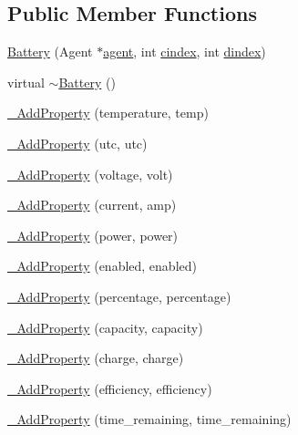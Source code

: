 \subsection*{Public Member Functions}
\begin{DoxyCompactItemize}
\item 
\hyperlink{classcubesat_1_1Battery_a2c27589782cfbb60129eb2a98a8ee0f4}{Battery} (Agent $\ast$\hyperlink{classcubesat_1_1Device_a8499108eccaf7375bea8ead0182391a6}{agent}, int \hyperlink{classcubesat_1_1Device_a1deca725b01f8ef37e49662da6db4e53}{cindex}, int \hyperlink{classcubesat_1_1Device_a8a2b3d6d7400e6796c31705058172982}{dindex})
\item 
virtual \hyperlink{classcubesat_1_1Battery_aa57aef1e0d1094eba5c7167156936607}{$\sim$\+Battery} ()
\item 
\hyperlink{classcubesat_1_1Battery_ad85cb4924badf1334a5f49edc8d5553c}{\+\_\+\+Add\+Property} (temperature, temp)
\item 
\hyperlink{classcubesat_1_1Battery_ace4f8ae340d704a56e2605792f084b57}{\+\_\+\+Add\+Property} (utc, utc)
\item 
\hyperlink{classcubesat_1_1Battery_a5c04c3be3f27e6476d1d36f95aebbc1a}{\+\_\+\+Add\+Property} (voltage, volt)
\item 
\hyperlink{classcubesat_1_1Battery_a0d8d177978d071aa3fb5012656fa2011}{\+\_\+\+Add\+Property} (current, amp)
\item 
\hyperlink{classcubesat_1_1Battery_a4141a2442d1b8f1dee5fb4925a11b17c}{\+\_\+\+Add\+Property} (power, power)
\item 
\hyperlink{classcubesat_1_1Battery_a9714a7dbbb19768ee8d2d1ea1b3011cd}{\+\_\+\+Add\+Property} (enabled, enabled)
\item 
\hyperlink{classcubesat_1_1Battery_a668dabc1438e3ad246e0d3168739a5ec}{\+\_\+\+Add\+Property} (percentage, percentage)
\item 
\hyperlink{classcubesat_1_1Battery_a2682885fce26c9b7d982b5ca57faaf17}{\+\_\+\+Add\+Property} (capacity, capacity)
\item 
\hyperlink{classcubesat_1_1Battery_ad81af4425073ae604a62d34a63f55506}{\+\_\+\+Add\+Property} (charge, charge)
\item 
\hyperlink{classcubesat_1_1Battery_a04d91c0ec695dfdedc33e5f3e4c74383}{\+\_\+\+Add\+Property} (efficiency, efficiency)
\item 
\hyperlink{classcubesat_1_1Battery_a0fb694ff309d0be2bbb1fc4d362c2984}{\+\_\+\+Add\+Property} (time\+\_\+remaining, time\+\_\+remaining)
\end{DoxyCompactItemize}
